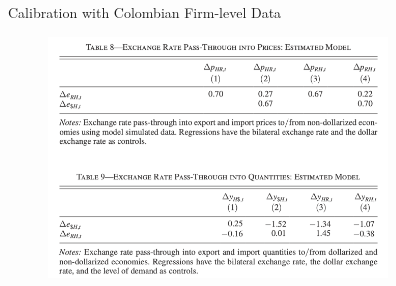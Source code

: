 \documentclass{beamer}
\begin{document}
\begin{frame}{Calibration with Colombian Firm-level Data}
    \begin{figure}[htp]
        \centering
        \includegraphics[width=9cm]{Table8.png}
    \end{figure}
\end{frame}
\end{document}
